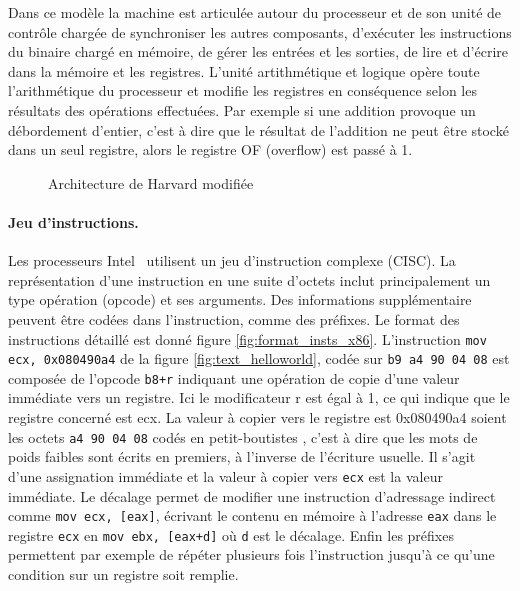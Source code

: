 Dans ce modèle la machine est articulée autour du processeur et de son unité de contrôle chargée de synchroniser les autres composants, d'exécuter les instructions du binaire chargé en mémoire, de gérer les entrées et les sorties, de lire et d'écrire dans la mémoire et les registres. L'unité artithmétique et logique opère toute l'arithmétique du processeur et modifie les registres en conséquence selon les résultats des opérations effectuées. Par exemple si une addition provoque un débordement d'entier, c'est à dire que le résultat de l'addition ne peut être stocké dans un seul registre, alors le registre OF (overflow) est passé à 1.

\begin{figure}
\begin{center}

\caption{Architecture de Harvard modifiée}
\label{fig:arch_harvard_mod}
\end{center}
\end{figure}

\paragraph{Jeu d'instructions.}
Les processeurs Intel \xq\ utilisent un jeu d'instruction complexe (CISC). La représentation d'une instruction en une suite d'octets inclut principalement un type opération (opcode) et ses arguments. Des informations supplémentaire peuvent être codées dans l'instruction, comme des préfixes. Le format des instructions détaillé est donné figure \ref{fig:format_insts_x86}. 
L'instruction \texttt{mov ecx, 0x080490a4} de la figure \ref{fig:text_helloworld}, codée sur \texttt{b9 a4 90 04 08} est composée de l'opcode \texttt{b8+r} indiquant une opération de copie d'une valeur immédiate vers un registre. Ici le modificateur r est égal à 1, ce qui indique que le registre concerné est ecx. La valeur à copier vers le registre est 0x080490a4 soient les octets \texttt{a4 90 04 08} codés en petit-boutistes , c'est à dire que les mots de poids faibles sont écrits en premiers, à l'inverse de l'écriture usuelle.
Il s'agit d'une assignation immédiate et la valeur à copier vers \texttt{ecx} est la valeur immédiate.
Le décalage permet de modifier une instruction d'adressage indirect comme \texttt{mov ecx, [eax]}, écrivant le contenu en mémoire à l'adresse \texttt{eax} dans le registre \texttt{ecx} en \texttt{mov ebx, [eax+d]} où \texttt{d} est le décalage.
Enfin les préfixes permettent par exemple de répéter plusieurs fois l'instruction jusqu'à ce qu'une condition sur un registre soit remplie.

